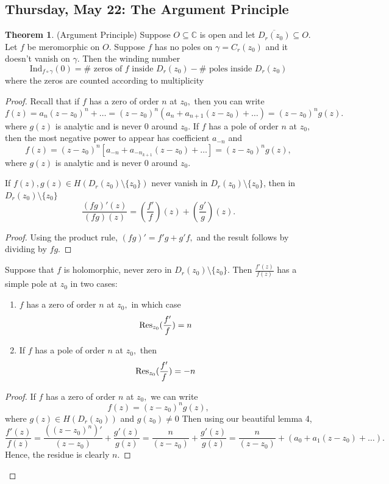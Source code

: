 \documentclass[10pt, oneside]{article}
\newcommand{\bbC}{\mathbb{C}}
\newcommand{\Ind}{\text{Ind}}
\newcommand{\sm}{\setminus}
\theoremstyle{definition}
\newtheorem{thm}{Theorem}
\newcommand{\bbC}{\mathbb{C}}
\newcommand{\sm}{\setminus}
\begin{document}
\newpage
\subsection{Thursday, May 22: The Argument Principle}
\begin{thm}
    (Argument Principle) Suppose $O\subseteq \bbC$ is open and let $\overline{D_r(z_0)}\subseteq O.$ Let $f$ be meromorphic on $O.$ Suppose $f$ has no poles on $\gamma = C_r(z_0)$ and it doesn't vanish on $\gamma.$ Then the winding number 
    \[\Ind_{f\circ \gamma}(0) = \#\text{ zeros of $f$ inside } D_{r}(z_0) - \# \text{ poles inside $D_{r}(z_0)$}\] where the zeros are counted according to multiplicity
\end{thm}
\begin{proof}
    Recall that if $f$ has a zero of order $n$ at $z_0,$ then you can write 
    \[f(z) = a_n(z-z_0)^n+ \dots = (z-z_0)^n (a_n+ a_{n+1}(z-z_0) + \dots)= (z-z_0)^ng(z).\] where $g(z)$ is analytic and is never $0$ around $z_0.$ If $f$ has a pole of order $n$ at $z_0,$ then the most negative power to appear has coefficient $a_{-n}$ and 
    \[f(z) = (z-z_0)^n\left[a_{-n}+ a_{-n_{k+1}}(z-z_0) + \dots\right]= (z-z_0)^n g(z),\] where $g(z)$ is analytic and is never $0$ around $z_0.$ 
    \begin{lemma}
        If $f(z), g(z)\in H(D_r(z_0)\sm \{z_0\})$ never vanish in $D_r(z_0)\sm \{z_0\}$, then in $D_r(z_0)\sm\{z_0\}$
        \[\frac{(f g)'(z)}{(f g)(z)} = (\frac{f'}{f})(z) + (\frac{g'}{g})(z).\]
    \end{lemma}
    \begin{proof}
        Using the product rule, $(fg)' = f'g + g'f,$ and the result follows by dividing by $fg.$ 
    \end{proof}
    \begin{lemma}
        Suppose that $f$ is holomorphic, never zero in 
        $D_r(z_0)\sm \{z_0\}.$ Then $\frac{f'(z)}{f(z)}$ has a simple pole at $z_0$ in two cases:
        \begin{enumerate}
            \item $f$ has a zero of order $n$ at $z_0,$ in which case 
            \[\Res_{z_0}(\frac{f'}{f}) = n\]
            \item If $f$ has a pole of order $n$ at $z_0,$ then 
            \[\Res_{z_0}(\frac{f'}{f}) = -n\]
        \end{enumerate}
    \end{lemma}
    \begin{proof}
        If $f$ has a zero of order $n$ at $z_0,$ we can write 
        \[f(z) = (z- z_0)^n g(z),\] where $g(z) \in H(D_r(z_0))$ and $g(z_0)\neq 0$ Then using our beautiful lemma 4,
        \[\frac{f'(z)}{f(z)}= \frac{\left((z - z_0)^n\right)'}{(z-z_0)} + \frac{g'(z)}{g(z)}= \frac{n}{(z-z_0)} + \frac{g'(z)}{g(z)} = \frac{n}{(z-z_0)} + (a_0 + a_1(z-z_0) + \dots).\] Hence, the residue is clearly $n.$


\end{proof}
\end{proof}
\end{document}
